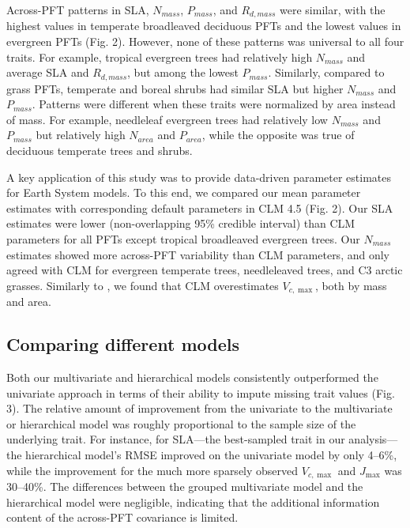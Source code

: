 \documentclass{article}
\begin{document}
Across-PFT patterns in SLA, $N_{mass}$, $P_{mass}$, and $R_{d,mass}$ were similar,
with the highest values in temperate broadleaved deciduous PFTs and the lowest values in evergreen PFTs (Fig. 2).
However, none of these patterns was universal to all four traits.
For example, tropical evergreen trees had relatively high $N_{mass}$ and average SLA and $R_{d,mass}$, but among the lowest $P_{mass}$.
Similarly, compared to grass PFTs, temperate and boreal shrubs had similar SLA but higher $N_{mass}$ and $P_{mass}$.
Patterns were different when these traits were normalized by area instead of mass.
For example, needleleaf evergreen trees had relatively low $N_{mass}$ and $P_{mass}$ but relatively high $N_{area}$ and $P_{area}$, while the opposite was true of deciduous temperate trees and shrubs.

A key application of this study was to provide data-driven parameter estimates for Earth System models.
To this end, we compared our mean parameter estimates with corresponding default parameters in CLM 4.5 \citep{clm45_note} (Fig. 2).
Our SLA estimates were lower (non-overlapping 95\% credible interval) than CLM parameters for all PFTs except tropical broadleaved evergreen trees.
Our $N_{mass}$ estimates showed more across-PFT variability than CLM parameters, and only agreed with CLM for evergreen temperate trees, needleleaved trees, and C3 arctic grasses.
Similarly to \citet{kattge_2009_quantifying}, we found that CLM overestimates $V_{c,\max}$, both by mass and area.

\subsection{Comparing different models}

Both our multivariate and hierarchical models consistently outperformed the univariate approach in terms of their ability to impute missing trait values (Fig. 3).
The relative amount of improvement from the univariate to the multivariate or hierarchical model was roughly proportional to the sample size of the underlying trait.
For instance, for SLA---the best-sampled trait in our analysis---the hierarchical model's RMSE improved on the univariate model by only 4--6\%,
while the improvement for the much more sparsely observed $V_{c,\max}$ and $J_{\max}$ was 30--40\%.
The differences between the grouped multivariate model and the hierarchical model were negligible,
indicating that the additional information content of the across-PFT covariance is limited.
\end{document}
